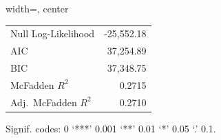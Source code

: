 \begin{table}[pos=H]
\begin{adjustbox}{width=\textwidth, center}
\begin{tabular}{lrrrlrrr}
\multicolumn{4}{l}{Null Log-Likelihood} & \multicolumn{4}{r}{-25,552.18}\\
\multicolumn{4}{l}{AIC} & \multicolumn{4}{r}{37,254.89}\\
\multicolumn{4}{l}{BIC} & \multicolumn{4}{r}{37,348.75}\\
\multicolumn{4}{l}{McFadden $R^2$} & \multicolumn{4}{r}{0.2715}\\
\multicolumn{4}{l}{Adj.\ McFadden $R^2$} & \multicolumn{4}{r}{0.2710}\\ 
\bottomrule
\end{tabular}
\end{adjustbox}
\begin{minipage}{\textwidth}\footnotesize
Signif. codes: 0 `***' 0.001 `**' 0.01 `*' 0.05 `.' 0.1.
\end{minipage}
\end{table}
